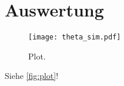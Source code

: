 \section{Auswertung}
\label{sec:Auswertung}

\begin{figure}
  \centering
  \texttt{[image: theta\_sim.pdf]}
  \caption{Plot.}
  \label{fig:plot}
\end{figure}


Siehe \autoref{fig:plot}!
